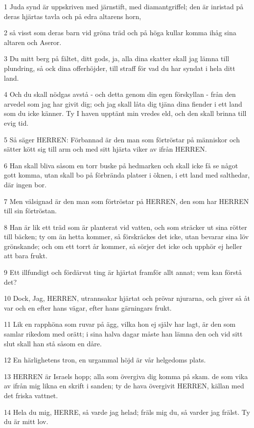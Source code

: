 \par 1 Juda synd är uppskriven med järnstift, med diamantgriffel; den är inristad på deras hjärtas tavla och på edra altarens horn,
\par 2 så visst som deras barn vid gröna träd och på höga kullar komma ihåg sina altaren och Aseror.
\par 3 Du mitt berg på fältet, ditt gods, ja, alla dina skatter skall jag lämna till plundring, så ock dina offerhöjder, till straff för vad du har syndat i hela ditt land.
\par 4 Och du skall nödgas avstå - och detta genom din egen förskyllan - från den arvedel som jag har givit dig; och jag skall låta dig tjäna dina fiender i ett land som du icke känner. Ty I haven upptänt min vredes eld, och den skall brinna till evig tid.
\par 5 Så säger HERREN: Förbannad är den man som förtröstar på människor och sätter kött sig till arm och med sitt hjärta viker av ifrån HERREN.
\par 6 Han skall bliva såsom en torr buske på hedmarken och skall icke få se något gott komma, utan skall bo på förbrända platser i öknen, i ett land med salthedar, där ingen bor.
\par 7 Men välsignad är den man som förtröstar på HERREN, den som har HERREN till sin förtröstan.
\par 8 Han är lik ett träd som är planterat vid vatten, och som sträcker ut sina rötter till bäcken; ty om än hetta kommer, så förskräckes det icke, utan bevarar sina löv grönskande; och om ett torrt år kommer, så sörjer det icke och upphör ej heller att bara frukt.
\par 9 Ett illfundigt och fördärvat ting är hjärtat framför allt annat; vem kan förstå det?
\par 10 Dock, Jag, HERREN, utrannsakar hjärtat och prövar njurarna, och giver så åt var och en efter hans vägar, efter hans gärningars frukt.
\par 11 Lik en rapphöna som ruvar på ägg, vilka hon ej själv har lagt, är den som samlar rikedom med orätt; i sina halva dagar måste han lämna den och vid sitt slut skall han stå såsom en dåre.
\par 12 En härlighetens tron, en urgammal höjd är vår helgedoms plats.
\par 13 HERREN är Israels hopp; alla som övergiva dig komma på skam. de som vika av ifrån mig likna en skrift i sanden; ty de hava övergivit HERREN, källan med det friska vattnet.
\par 14 Hela du mig, HERRE, så varde jag helad; fräls mig du, så varder jag frälst. Ty du är mitt lov.
